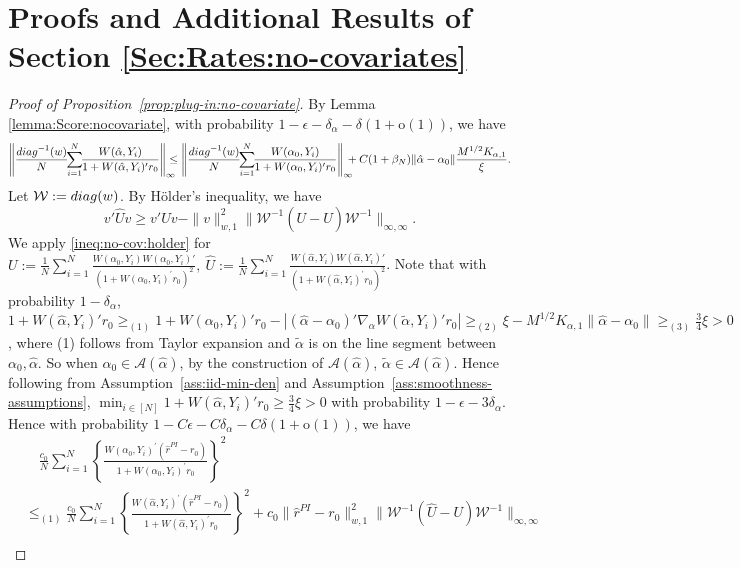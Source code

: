 \documentclass[11pt]{article}
\begin{document}
\section{Proofs and Additional Results of Section \ref{Sec:Rates:no-covariates}}\label{sec:proof:no-cov}
\begin{proof}[Proof of Proposition~\ref{prop:plug-in:no-covariate}]
By Lemma \ref{lemma:Score:nocovariate}, with probability $1-\epsilon-\delta_{\alpha}-\delta(1+\mathrm{o}(1))$, we have 
$$\left\|\frac{{\rm diag}^{-1}(w)}{N}\!\!\sum_{i=1}^N\!\!\frac{W(\hat\alpha,Y_i)}{1+W(\hat\alpha,Y_i)'r_0}\right\|_\infty\!\!\!\!\!\leq\left\|\frac{{\rm diag}^{-1}(w)}{N}\!\!\sum_{i=1}^N\!\!\frac{W(\alpha_0,Y_i)}{1+W(\alpha_0,Y_i)'r_0}\right\|_\infty \!\!\!\!+C(1+\beta_N)\|\hat\alpha-\alpha_0\| \frac{M^{1/2}K_{\alpha,1}}{\xi}.$$ 
Let $\mathcal{W}:={\rm diag}(w)$. By H\"older's inequality, we have 
\begin{equation}\label{ineq:no-cov:holder}
\displaystyle v'\hat Uv \geq v'Uv - \|v\|_{w,1}^2\|\mathcal{W}^{-1}(U-\hat U)\mathcal{W}^{-1}\|_{\infty,\infty}.    
\end{equation}
We apply \eqref{ineq:no-cov:holder} for 
$U:=\frac{1}{N}\sum_{i=1}^N\frac{W(\alpha_0,Y_i)W(\alpha_0,Y_i)'}{(1+W(\alpha_0,Y_i)^\prime r_0)^2},\ \hat U :=\frac{1}{N}\sum_{i=1}^N\frac{W(\hat\alpha,Y_i)W(\hat\alpha,Y_i)'}{(1+W(\hat\alpha,Y_i)^\prime r_0)^2}$. Note that with probability $1-\delta_{\alpha}$, $1+W(\hat{\alpha},Y_i)'r_0\geq_{(1)}1+W(\alpha_0,Y_i)'r_0-|(\hat{\alpha}-\alpha_0)'\nabla_{\alpha}W(\tilde{\alpha},Y_i)'r_0|\geq_{(2)}\xi-M^{1/2}K_{\alpha,1}\|\hat{\alpha}-\alpha_0\|\geq_{(3)}\frac{3}{4}\xi>0$, where (1) follows from Taylor expansion and $\tilde{\alpha}$ is on the line segment between $\alpha_0, \hat{\alpha}$. So when $\alpha_0\in\mathcal{A}(\hat{\alpha})$, by the construction of $\mathcal{A}(\hat{\alpha})$, $\tilde\alpha\in\mathcal{A}(\hat{\alpha})$. Hence following from Assumption~\ref{ass:iid-min-den} and  Assumption~\ref{ass:smoothness-assumptions}, $\min_{i\in[N]}1+W(\hat{\alpha},Y_i)'r_0\geq\frac{3}{4}\xi>0$ with probability $1-\epsilon-3\delta_{\alpha}$. Hence with probability $1-C\epsilon-C\delta_{\alpha}-C\delta(1+\mathrm{o}(1))$, we have  
$$\begin{array}{rl}
&\displaystyle\quad\frac{c_0}{N}\sum_{i=1}^N\left\{\frac{W(\alpha_0,Y_i)^\prime(\hat{r}^{PI}-r_0)}{1+W(\alpha_0,Y_i)^\prime r_0}\right\}^2\\ 
&\displaystyle\leq_{(1)}\frac{c_0}{N}\sum_{i=1}^N\left\{\frac{W(\hat\alpha,Y_i)^\prime(\hat{r}^{PI}-r_0)}{1+W(\hat\alpha,Y_i)^\prime r_0}\right\}^2+c_0\|\hat r^{PI} - r_0\|_{w,1}^2 \|\mathcal{W}^{-1}(\hat U - U)\mathcal{W}^{-1} \|_{\infty,\infty}\\

\end{array}$$
\end{proof}
\end{document}

